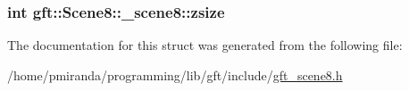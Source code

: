 \subsubsection[{\texorpdfstring{zsize}{zsize}}]{\setlength{\rightskip}{0pt plus 5cm}int gft\+::\+Scene8\+::\+\_\+scene8\+::zsize}\hypertarget{structgft_1_1Scene8_1_1__scene8_a356d326df4b0c6d8e9695911f6459973}{}\label{structgft_1_1Scene8_1_1__scene8_a356d326df4b0c6d8e9695911f6459973}


The documentation for this struct was generated from the following file\+:\begin{DoxyCompactItemize}
\item 
/home/pmiranda/programming/lib/gft/include/\hyperlink{gft__scene8_8h}{gft\+\_\+scene8.\+h}\end{DoxyCompactItemize}
